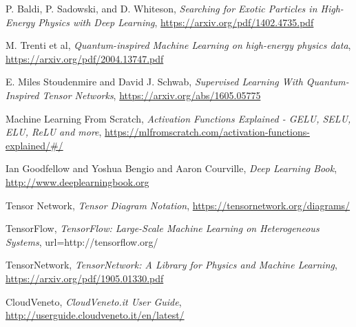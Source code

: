 \begin{thebibliography}{99}

P. Baldi, P. Sadowski, and D. Whiteson,
\textit{Searching for Exotic Particles in High-Energy Physics with Deep Learning},
\url{https://arxiv.org/pdf/1402.4735.pdf}

M. Trenti et al,
\textit{Quantum-inspired Machine Learning on high-energy physics data},
\url{https://arxiv.org/pdf/2004.13747.pdf}

E. Miles Stoudenmire and David J. Schwab,
\textit{Supervised Learning With Quantum-Inspired Tensor Networks},
\url{https://arxiv.org/abs/1605.05775}

Machine Learning From Scratch,
\textit{Activation Functions Explained - GELU, SELU, ELU, ReLU and more},
\url{https://mlfromscratch.com/activation-functions-explained/#/}

Ian Goodfellow and Yoshua Bengio and Aaron Courville,
\textit{Deep Learning Book},
\url{http://www.deeplearningbook.org}

Tensor Network,
\textit{Tensor Diagram Notation},
\url{https://tensornetwork.org/diagrams/}

TensorFlow,
\textit{TensorFlow: Large-Scale Machine Learning on Heterogeneous Systems},
url={http://tensorflow.org/}

TensorNetwork,
\textit{TensorNetwork: A Library for Physics and Machine Learning}, 
\url{https://arxiv.org/pdf/1905.01330.pdf}

CloudVeneto,
\textit{CloudVeneto.it User Guide},
\url{http://userguide.cloudveneto.it/en/latest/}

\end{thebibliography}
